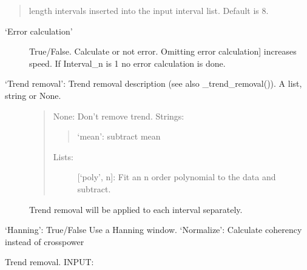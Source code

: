 \documentclass[letterpaper,10pt,english]{sphinxmanual}
\begin{document}
\begin{fulllineitems}
\begin{fulllineitems}
\begin{description}
\begin{description}
\begin{quote}
length intervals inserted into the input interval list. Default is 8.
\end{quote}
\begin{description}
\item[{‘Error calculation’}] \leavevmode{[}True/False. Calculate or not error. Omitting error calculation{]}
increases speed. If Interval\_n is 1 no error calculation is done.

\item[{‘Trend removal’: Trend removal description (see also \_trend\_removal()). A list, string or None.}] \leavevmode\begin{quote}

None: Don’t remove trend.
Strings:
\begin{quote}

‘mean’: subtract mean
\end{quote}
\begin{description}
\item[{Lists:}] \leavevmode
{[}‘poly’, n{]}: Fit an n order polynomial to the data and subtract.

\end{description}
\end{quote}

Trend removal will be applied to each interval separately.

\end{description}

‘Hanning’: True/False Use a Hanning window.
‘Normalize’: Calculate coherency instead of crosspower

\end{description}

\end{description}

\end{fulllineitems}


\begin{fulllineitems}
\label{\detokenize{data_object:flap.data_object.DataObject.detrend}}
Trend removal.
INPUT:
\begin{quote}


\end{quote}
\end{fulllineitems}
\end{fulllineitems}
\end{document}
